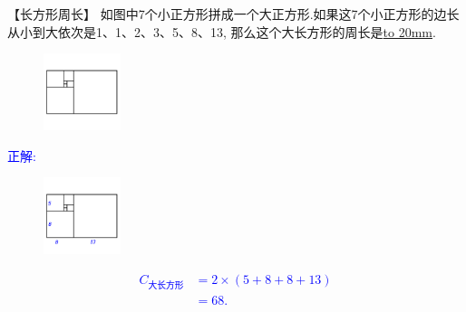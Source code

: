 \item {
    【长方形周长】
    如图中7个小正方形拼成一个大正方形.如果这7个小正方形的边长从小到大依次是1、1、2、3、5、8、13, 那么这个大长方形的周长是\underline{\hbox to 20mm{}}.
    \begin{figure}[H] 
        \centering
        \includegraphics[width=0.2\textwidth]{./pics/Chapter_2/20.png}
    \end{figure}
    \ifshowSolution 
        \fangsong{}\textcolor{blue}{
            正解: \\
            \begin{figure}[H] 
                \centering
                \includegraphics[width=0.2\textwidth]{./pics/Chapter_2/seikai_20.png}
            \end{figure}
            \begin{align*}
                C_{大长方形} &= 2\times (5+8+8+13)\\
                &= 68.
            \end{align*}
        }
    \else
        \vspace{1cm}
    \fi
}

